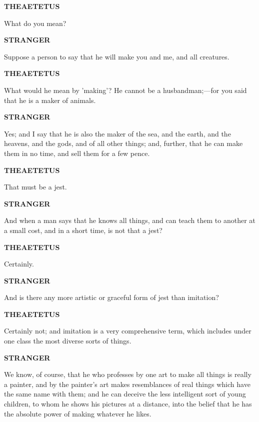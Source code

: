 \documentclass[11pt,letter]{article}
\begin{document}
\par \textbf{THEAETETUS}
\par   What do you mean?

\par \textbf{STRANGER}
\par   Suppose a person to say that he will make you and me, and all creatures.

\par \textbf{THEAETETUS}
\par   What would he mean by 'making'? He cannot be a husbandman;—for you said that he is a maker of animals.

\par \textbf{STRANGER}
\par   Yes; and I say that he is also the maker of the sea, and the earth, and the heavens, and the gods, and of all other things; and, further, that he can make them in no time, and sell them for a few pence.

\par \textbf{THEAETETUS}
\par   That must be a jest.

\par \textbf{STRANGER}
\par   And when a man says that he knows all things, and can teach them to another at a small cost, and in a short time, is not that a jest?

\par \textbf{THEAETETUS}
\par   Certainly.

\par \textbf{STRANGER}
\par   And is there any more artistic or graceful form of jest than imitation?

\par \textbf{THEAETETUS}
\par   Certainly not; and imitation is a very comprehensive term, which includes under one class the most diverse sorts of things.

\par \textbf{STRANGER}
\par   We know, of course, that he who professes by one art to make all things is really a painter, and by the painter's art makes resemblances of real things which have the same name with them; and he can deceive the less intelligent sort of young children, to whom he shows his pictures at a distance, into the belief that he has the absolute power of making whatever he likes.
\end{document}
